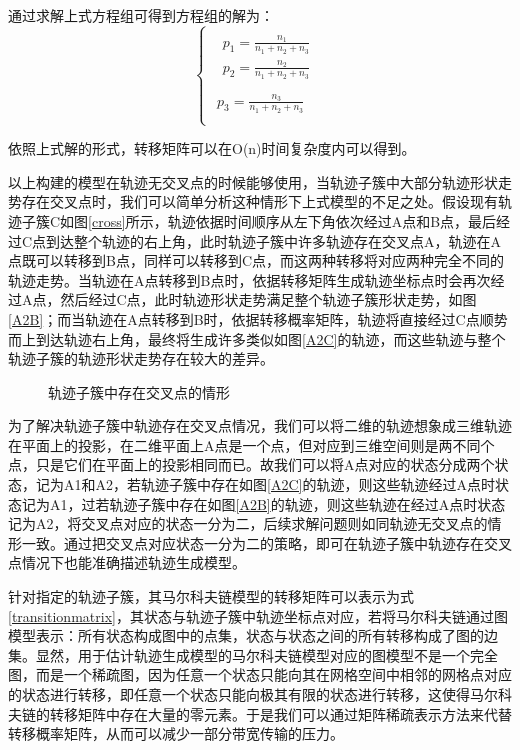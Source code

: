 通过求解上式方程组可得到方程组的解为：
\[
\begin{cases}
\begin{array}{c}
	\begin{array}{c}
	p_1=\frac{n_1}{n_1+n_2+n_3}\\
	p_2=\frac{n_2}{n_1+n_2+n_3}\\
\end{array}\\
	p_3=\frac{n_3}{n_1+n_2+n_3}\\
\end{array}    
\end{cases}
\]

依照上式解的形式，转移矩阵可以在O(n)时间复杂度内可以得到。

以上构建的模型在轨迹无交叉点的时候能够使用，当轨迹子簇中大部分轨迹形状走势存在交叉点时，我们可以简单分析这种情形下上式模型的不足之处。假设现有轨迹子簇C如图\ref{cross}所示，轨迹依据时间顺序从左下角依次经过A点和B点，最后经过C点到达整个轨迹的右上角，此时轨迹子簇中许多轨迹存在交叉点A，轨迹在A点既可以转移到B点，同样可以转移到C点，而这两种转移将对应两种完全不同的轨迹走势。当轨迹在A点转移到B点时，依据转移矩阵生成轨迹坐标点时会再次经过A点，然后经过C点，此时轨迹形状走势满足整个轨迹子簇形状走势，如图\ref{A2B}；而当轨迹在A点转移到B时，依据转移概率矩阵，轨迹将直接经过C点顺势而上到达轨迹右上角，最终将生成许多类似如图\ref{A2C}的轨迹，而这些轨迹与整个轨迹子簇的轨迹形状走势存在较大的差异。
\begin{figure}[h]
\caption{轨迹子簇中存在交叉点的情形}
\label{crosssituation}
\end{figure}

为了解决轨迹子簇中轨迹存在交叉点情况，我们可以将二维的轨迹想象成三维轨迹在平面上的投影，在二维平面上A点是一个点，但对应到三维空间则是两不同个点，只是它们在平面上的投影相同而已。故我们可以将A点对应的状态分成两个状态，记为A1和A2，若轨迹子簇中存在如图\ref{A2C}的轨迹，则这些轨迹经过A点时状态记为A1，过若轨迹子簇中存在如图\ref{A2B}的轨迹，则这些轨迹在经过A点时状态记为A2，将交叉点对应的状态一分为二，后续求解问题则如同轨迹无交叉点的情形一致。通过把交叉点对应状态一分为二的策略，即可在轨迹子簇中轨迹存在交叉点情况下也能准确描述轨迹生成模型。

针对指定的轨迹子簇，其马尔科夫链模型的转移矩阵可以表示为式\ref{transitionmatrix}，其状态与轨迹子簇中轨迹坐标点对应，若将马尔科夫链通过图模型表示：所有状态构成图中的点集，状态与状态之间的所有转移构成了图的边集。显然，用于估计轨迹生成模型的马尔科夫链模型对应的图模型不是一个完全图，而是一个稀疏图，因为任意一个状态只能向其在网格空间中相邻的网格点对应的状态进行转移，即任意一个状态只能向极其有限的状态进行转移，这使得马尔科夫链的转移矩阵中存在大量的零元素。于是我们可以通过矩阵稀疏表示方法来代替转移概率矩阵，从而可以减少一部分带宽传输的压力。\\

